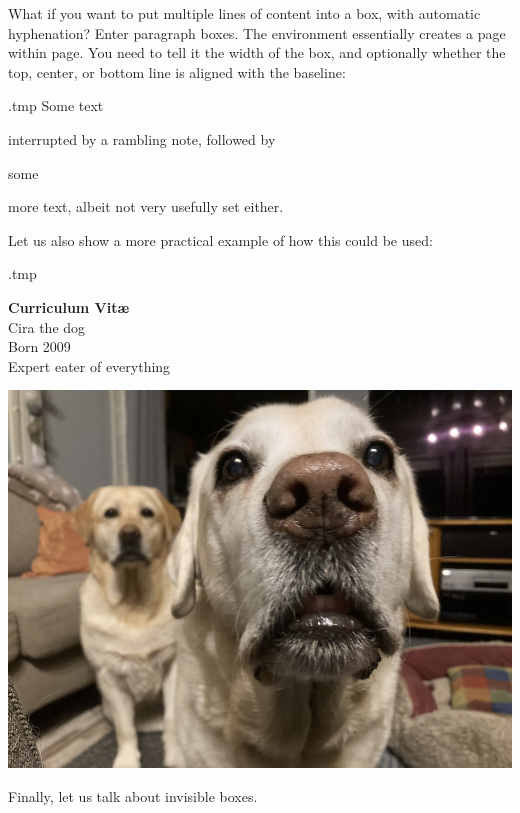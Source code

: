 What if you want to put multiple lines of content into a box,
with automatic hyphenation?
Enter paragraph boxes.
The  environment essentially creates a page within page.
You need to tell it the width of the box, and optionally whether the
top, center, or bottom line is aligned with the baseline:
%
\begin{VerbatimOut}{\jobname.tmp}
Some text
\begin{minipage}[b]{2.7cm}
interrupted by a rambling
note, followed by
\end{minipage}
some
\begin{minipage}[t]{2cm}
more text, albeit not
very usefully set either.
\end{minipage}
\end{VerbatimOut}
\ShowExampleBelow
%
Let us also show a more practical example of how this could be used:
%
\begin{VerbatimOut}{\jobname.tmp}
\begin{minipage}[c]{5cm}
\textbf{Curriculum Vit\ae}\\
Cira the dog\\
Born 2009\\
Expert eater of everything
\end{minipage}
\hfill
\begin{minipage}[c]{4cm}
\includegraphics[bb=2.8cm 1.4cm 7cm 6cm, clip, width=\textwidth]
    {pictures/TheDogs.jpg}
\end{minipage}
\end{VerbatimOut}
\ShowExampleBelow


Finally, let us talk about invisible boxes.

